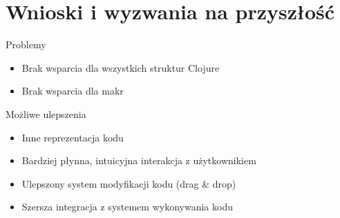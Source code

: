 \documentclass[presentation]{beamer}
\begin{document}
\section{Wnioski i wyzwania na przyszłość}
\label{sec-5}
\begin{frame}[label=sec-5-1]{Problemy}
\begin{itemize}
\item Brak wsparcia dla wszystkich struktur Clojure
\item Brak wsparcia dla makr
\end{itemize}
\end{frame}
\begin{frame}[label=sec-5-2]{Możliwe ulepszenia}
\begin{itemize}
\item Inne reprezentacja kodu
\item Bardziej płynna, intuicyjna interakcja z użytkownikiem
\item Ulepszony system modyfikacji kodu (drag \& drop)
\item Szersza integracja z systemem wykonywania kodu
\end{itemize}
\end{frame}
\end{document}

